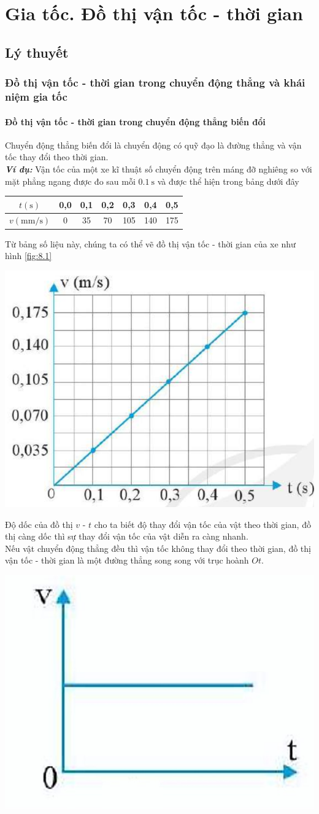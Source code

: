 \let\lesson\undefined
\newcommand{\lesson}{\phantomlesson{Bài 7: Gia tốc. Chuyển động thẳng biến đổi đều}}
\chapter[Gia tốc. Đồ thị vận tốc - thời gian]{Gia tốc. Đồ thị vận tốc - thời gian}
\setcounter{section}{0}
\section{Lý thuyết}
\subsection{Đồ thị vận tốc - thời gian trong chuyển động thẳng và khái niệm gia tốc}
\subsubsection{Đồ thị vận tốc - thời gian trong chuyển động thẳng biến đổi}
Chuyển động thẳng biến đổi là chuyển động có quỹ đạo là đường thẳng và vận tốc thay đổi theo thời gian.\\
\textbf{\textit{Ví dụ:}} Vận tốc của một xe kĩ thuật số chuyển động trên máng đỡ nghiêng so với mặt phẳng ngang được đo sau mỗi $\SI{0.1}{\second}$ và được thể hiện trong bảng dưới đây
\begin{center}
	\begin{tabular}{|c|c|c|c|c|c|c|}
		\hline
		$t \left(\si{\second}\right)$ & 0,0 & 0,1 & 0,2 & 0,3 & 0,4 & 0,5\\
		\hline
		$v \left(\si{\milli\meter/\second}\right)$& 0 & 35 & 70 & 105 & 140 & 175\\
		\hline
	\end{tabular}
\end{center}
Từ bảng số liệu này, chúng ta có thể vẽ đồ thị vận tốc - thời gian của xe như hình \ref{fig:8.1}
\begin{center}
	\includegraphics[width=0.3\linewidth]{../figs/VN10-2023-PH-TP008-1}
	\label{fig:8.1}
\end{center}
Độ dốc của đồ thị $v$ - $t$ cho ta biết độ thay đổi vận tốc của vật theo thời gian, đồ thị càng dốc thì sự thay đổi vận tốc của vật diễn ra càng nhanh.\\
Nếu vật chuyển động thẳng đều thì vận tốc không thay đổi theo thời gian, đồ thị vận tốc - thời gian là một đường thẳng song song với trục hoành $Ot$.
\begin{center}
	\includegraphics[width=0.2\linewidth]{../figs/VN10-2023-PH-TP008-3}
\end{center}

